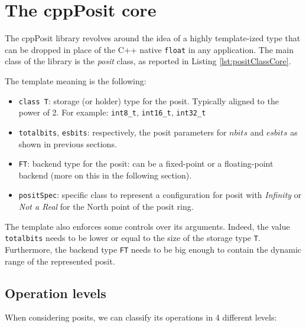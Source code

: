 \section{The cppPosit core}\label{sec:cppPositCore}

The cppPosit library revolves around the idea of a highly template-ized type that can be dropped in place of the C++ native \texttt{float} in any application. 
The main class of the library is the \textit{posit} class, as reported in Listing \ref{lst:positClassCore}.  

The template meaning is the following:
\begin{itemize}
    \item \texttt{class T}: storage (or holder) type for the posit. Typically aligned to the power of 2. For example: \texttt{int8\_t}, \texttt{int16\_t}, \texttt{int32\_t}
    \item \texttt{totalbits}, \texttt{esbits}: respectively, the posit parameters for $nbits$ and $esbits$ as shown in previous sections.
    \item \texttt{FT}: backend type for the posit: can be a fixed-point or a floating-point backend (more on this in the following section).
    \item \texttt{positSpec}: specific class to represent a configuration for posit with \textit{Infinity} or \textit{Not a Real} for the North point of the posit ring.
\end{itemize}
The template also enforces some controls over its arguments. Indeed, the value \texttt{totalbits} needs to be lower or equal to the size of the storage type \texttt{T}. Furthermore, the backend type \texttt{FT} needs to be big enough to contain the dynamic range of the represented posit.


\subsection{Operation levels}

When considering posits, we can classify its operations in 4 different levels:

